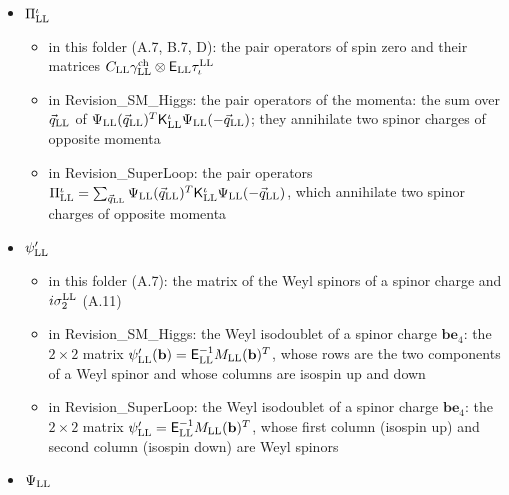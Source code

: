\documentclass[
  10pt,
]{article}
\providecommand{\tightlist}{%
  \setlength{\itemsep}{0pt}\setlength{\parskip}{0pt}}
\begin{document}
\begin{itemize}
  \begin{itemize}
  \tightlist
  \item
    in this folder (A.7): the grand potential per volume (A.17)
  \item
    in Revision\_SM\_Higgs: -- (not listed)
  \item
    in Revision\_SuperLoop: the grand potential per volume at zero
    temperature, measured from the normal state:
    \(\Omega_{\rm LL}=\lvert\vec d_{\rm LL}\rvert^2/G_{\rm LL}-\tfrac12\int\!d^3q_{\rm LL}(2\pi)^{-3}\sum(\text{positive eigenvalues of }\mathsf H_{\rm LL})\)
    minus its value at \(\vec d_{\rm LL}=0\)
  \end{itemize}
\item
  \(\Pi^\iota_{\rm LL}\)

  \begin{itemize}
  \tightlist
  \item
    in this folder (A.7, B.7, D): the pair operators of spin zero and
    their matrices
    \(C_{\rm LL}\gamma^{\rm ch}_{\rm LL}\otimes\mathsf E_{\rm LL}\tau^{\rm LL}_\iota\)
  \item
    in Revision\_SM\_Higgs: the pair operators of the momenta: the sum
    over \(\vec q_{\rm LL}\) of
    \(\Psi_{\rm LL}(\vec q_{\rm LL})^T\mathsf K^\iota_{\rm LL}\Psi_{\rm LL}(-\vec q_{\rm LL})\);
    they annihilate two spinor charges of opposite momenta
  \item
    in Revision\_SuperLoop: the pair operators
    \(\Pi^\iota_{\rm LL}=\sum_{\vec q_{\rm LL}}\Psi_{\rm LL}(\vec q_{\rm LL})^T\mathsf K^\iota_{\rm LL}\Psi_{\rm LL}(-\vec q_{\rm LL})\),
    which annihilate two spinor charges of opposite momenta
  \end{itemize}
\item
  \(\psi'_{\rm LL}\)

  \begin{itemize}
  \tightlist
  \item
    in this folder (A.7): the matrix of the Weyl spinors of a spinor
    charge and \(i\sigma^{\rm LL}_2\) (A.11)
  \item
    in Revision\_SM\_Higgs: the Weyl isodoublet of a spinor charge
    \(\mathbf b\mathbf e_4\): the \(2\times2\) matrix
    \(\psi'_{\rm LL}(\mathbf b)=\mathsf E_{\rm LL}^{-1}M_{\rm LL}(\mathbf b)^T\),
    whose rows are the two components of a Weyl spinor and whose columns
    are isospin up and down
  \item
    in Revision\_SuperLoop: the Weyl isodoublet of a spinor charge
    \(\mathbf b\mathbf e_4\): the \(2\times2\) matrix
    \(\psi'_{\rm LL}=\mathsf E_{\rm LL}^{-1}M_{\rm LL}(\mathbf b)^T\),
    whose first column (isospin up) and second column (isospin down) are
    Weyl spinors
  \end{itemize}
\item
  \(\Psi_{\rm LL}\)


\end{itemize}
\end{document}
